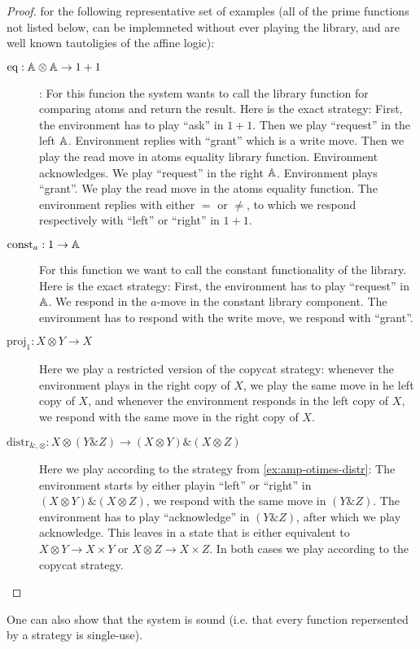\begin{proof}
    for the following representative set of examples (all of the prime functions not listed below, 
    can be implemneted without ever playing the library, and are well known tautoligies of the affine logic):
    \begin{description}
        \item[$\textrm{eq} : \mathbb A \otimes \mathbb A \to 1 + 1$]:
        For this funcion the system wants to call the library function for comparing atoms 
        and return the result. Here is the exact strategy:    
        First, the environment has to play ``ask'' in $1+1$. Then we play ``request'' in the left $\mathbb A$.
        Environment replies with ``grant'' which is a write move. Then we play the read 
        move in atoms equality library function. Environment acknowledges. We play ``request'' in the 
        right $\mathbb A$. Environment plays ``grant''. We play the read move in the atoms equality function. 
        The environment replies with either $=$ or $\neq$, to which we respond respectively with ``left''
        or ``right'' in $1+1$.

        \item[$\textrm{const}_a : 1 \to \mathbb A$] For this function we want to call the constant
        functionality of the library. Here is the exact strategy: First, the environment has to play 
        ``request'' in $\mathbb A$. We respond in the $a$-move in the constant library component. 
        The environment has to respond with the write move, we respond with ``grant''. 

        \item[$\textrm{proj}_1 : X \otimes Y \to X$] Here we play a restricted version of the copycat strategy:
        whenever the environment plays in the right copy of $X$, we play the same move in he left copy of $X$, 
        and whenever the environment responds in the left copy of $X$, we respond with the same move in the right 
        copy of $X$. 

        \item[$\textrm{distr}_{\&, \otimes} : X \otimes (Y \& Z) \to (X \otimes Y) \& (X \otimes Z)$]
        Here we play according to the strategy from \ref{ex:amp-otimes-distr}: The environment 
        starts by either playin ``left'' or ``right'' in $(X \otimes Y) \& (X \otimes Z)$, 
        we respond with the same move in $(Y \& Z)$. The environment has to play ``acknowledge'' 
        in $(Y \& Z)$, after which we play acknowledge. This leaves in a state that is either 
        equivalent to $X \otimes Y \to X \times Y$ or  $X \otimes Z \to X \times Z$. 
        In both cases we play according to the copycat strategy.  
    \end{description}
\end{proof}
One can also show that the system is sound (i.e. that every function repersented by a strategy is single-use). 

